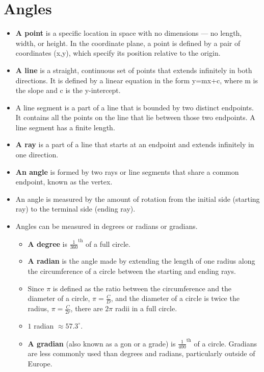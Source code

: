 \documentclass[12pt]{article}
\begin{document}
\section*{Angles}
\begin{itemize}
    \item \textbf{A point} is a specific location in space with no dimensions — no length, width, or height. In the coordinate plane, a point is defined by a pair of coordinates (x,y), which specify its position relative to the origin.
    \item \textbf{A line} is a straight, continuous set of points that extends infinitely in both directions. It is defined by a linear equation in the form y=mx+c, where m is the slope and c is the y-intercept.
    \item A line segment is a part of a line that is bounded by two distinct endpoints. It contains all the points on the line that lie between those two endpoints. A line segment has a finite length.
    \item \textbf{A ray} is a part of a line that starts at an endpoint and extends infinitely in one direction.
    \item \textbf{An angle} is formed by two rays or line segments that share a common endpoint, known as the vertex.

\vfill

    \item  An angle is measured by the amount of rotation from the initial side (starting ray) to the terminal side (ending ray).

\begin{center}
\end{center}
\newpage

    \item Angles can be measured in degrees or radians or gradians.
    \begin{itemize}
        \item \textbf{A degree} is $\frac{1}{360}^{\textrm{th}}$ of a full circle.
        \item \textbf{A radian} is the angle made by extending the length of one radius along the circumference of a circle between the starting and ending rays.
        \item Since $\pi$ is defined as the ratio between the circumference and the diameter of a circle, $\pi=\frac{C}{D}$, and the diameter of a circle is twice the radius, $\pi=\frac{C}{2r}$, there are $2\pi$ radii in a full circle.
        \item $1$ radian $\approx 57.3^{\circ}$.
        \item \textbf{A gradian} (also known as a gon or a grade) is $\frac{1}{400}^{\textrm{th}}$ of a circle. Gradians are less commonly used than degrees and radians, particularly outside of Europe.
    \end{itemize}
\end{itemize}
\end{document}
